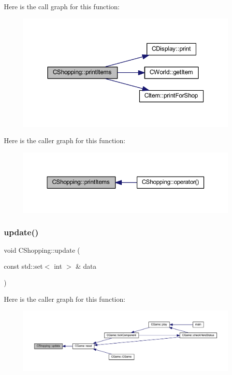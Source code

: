 Here is the call graph for this function\+:\nopagebreak
\begin{figure}[H]
\begin{center}
\leavevmode
\includegraphics[width=333pt]{class_c_shopping_acfb04014dcfe9b4ddca2206a567112c9_cgraph}
\end{center}
\end{figure}
Here is the caller graph for this function\+:\nopagebreak
\begin{figure}[H]
\begin{center}
\leavevmode
\includegraphics[width=340pt]{class_c_shopping_acfb04014dcfe9b4ddca2206a567112c9_icgraph}
\end{center}
\end{figure}
\mbox{\label{class_c_shopping_aa232d999181d07bfd6ec0ec5c645f51b}} 
\subsubsection{\texorpdfstring{update()}{update()}}
{\footnotesize\ttfamily void C\+Shopping\+::update (\begin{DoxyParamCaption}\item[{const std\+::set$<$ int $>$ \&}]{data }\end{DoxyParamCaption})\hspace{0.3cm}{\ttfamily [inline]}}

Here is the caller graph for this function\+:\nopagebreak
\begin{figure}[H]
\begin{center}
\leavevmode
\includegraphics[width=350pt]{class_c_shopping_aa232d999181d07bfd6ec0ec5c645f51b_icgraph}
\end{center}
\end{figure}


